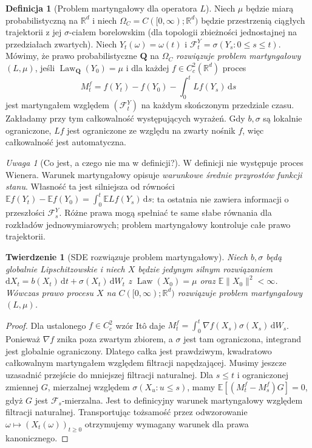 \documentclass[11pt,a4paper,oneside]{report}
\numberwithin{equation}{chapter}
\theoremstyle{plain}
\newtheorem{twierdzenie}{Twierdzenie}[chapter]
\theoremstyle{definition}
\newtheorem{definicja}{Definicja}[chapter]
\theoremstyle{remark}
\newtheorem{uwaga}{Uwaga}[chapter]
\newcommand{\R}{\mathbb{R}}
\newcommand{\E}{\mathbb{E}}
\newcommand{\Law}{\operatorname{Law}}
\newcommand{\calF}{\mathcal{F}}
\newcommand{\dd}{\mathrm{d}}
\newcommand{\norm}[1]{\lVert #1\rVert}
\begin{document}
\begin{definicja}[Problem martyngałowy dla operatora $L$]
\label{def:mp}
Niech $\mu$ będzie miarą probabilistyczną na $\R^d$ i niech
$\Omega_C=C([0,\infty);\R^d)$ będzie przestrzenią ciągłych trajektorii
z jej $\sigma$-ciałem borelowskim (dla topologii zbieżności jednostajnej
na przedziałach zwartych). Niech $Y_t(\omega)=\omega(t)$ i
$\calF_t^Y=\sigma(Y_s:0\le s\le t)$.
Mówimy, że prawo probabilistyczne $\mathbf Q$ na $\Omega_C$
\emph{rozwiązuje problem martyngałowy $(L,\mu)$}, jeśli
$\Law_{\mathbf Q}(Y_0)=\mu$ i dla każdej $f\in C_c^2(\R^d)$
proces
\[
M_t^f=f(Y_t)-f(Y_0)-\int_0^tLf(Y_s)\,\dd s
\]
jest martyngałem względem $(\calF_t^Y)$ na każdym skończonym
przedziale czasu. Zakładamy przy tym całkowalność występujących
wyrażeń. Gdy $b,\sigma$ są lokalnie ograniczone, $Lf$ jest ograniczone
ze względu na zwarty nośnik $f$, więc całkowalność jest automatyczna.
\end{definicja}

\begin{uwaga}[Co jest, a czego nie ma w definicji?]
W definicji nie występuje proces Wienera. Warunek
martyngałowy opisuje \emph{warunkowe średnie przyrostów funkcji
stanu}. Własność ta jest silniejsza od równości
$\E f(Y_t)-\E f(Y_0)=\int_0^t\E Lf(Y_s)\,\dd s$:
ta ostatnia nie zawiera informacji o przeszłości $\calF_s^Y$.
Różne prawa mogą spełniać te same słabe równania dla rozkładów
jednowymiarowych; problem martyngałowy kontroluje całe prawo trajektorii.
\end{uwaga}

\begin{twierdzenie}[SDE rozwiązuje problem martyngałowy]
\label{th:sde-to-mp}
Niech $b,\sigma$ będą globalnie Lipschitzowskie i niech $X$ będzie
jedynym silnym rozwiązaniem
$\dd X_t=b(X_t)\,\dd t+\sigma(X_t)\,\dd W_t$
z $\Law(X_0)=\mu$ oraz $\E\norm{X_0}^2<\infty$.
Wówczas prawo procesu $X$ na $C([0,\infty);\R^d)$ rozwiązuje
problem martyngałowy $(L,\mu)$.
\end{twierdzenie}
\begin{proof}
Dla ustalonego $f\in C_c^2$ wzór Itô daje
$M_t^f=\int_0^t\nabla f(X_s)\sigma(X_s)\,\dd W_s$.
Ponieważ $\nabla f$ znika poza zwartym zbiorem, a $\sigma$ jest
tam ograniczona, integrand jest globalnie ograniczony.
Dlatego całka jest prawdziwym, kwadratowo całkowalnym
martyngałem względem filtracji napędzającej. Musimy jeszcze
uzasadnić przejście do mniejszej filtracji naturalnej.
Dla $s\le t$ i ograniczonej zmiennej $G$, mierzalnej względem
$\sigma(X_u:u\le s)$, mamy $\E[(M_t^f-M_s^f)G]=0$,
gdyż $G$ jest $\calF_s$-mierzalna. Jest to definicyjny
warunek martyngałowy względem filtracji naturalnej.
Transportując tożsamość przez odwzorowanie
$\omega\mapsto(X_t(\omega))_{t\ge0}$ otrzymujemy
wymagany warunek dla prawa kanonicznego.
\end{proof}
\end{document}
